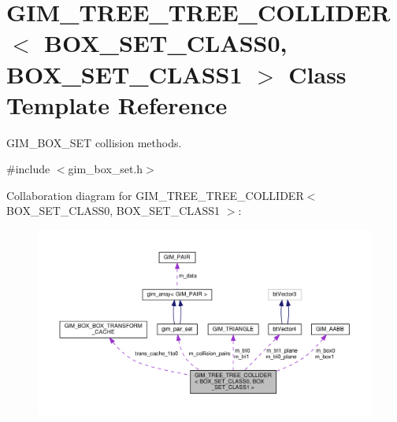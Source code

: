 \hypertarget{classGIM__TREE__TREE__COLLIDER}{}\section{G\+I\+M\+\_\+\+T\+R\+E\+E\+\_\+\+T\+R\+E\+E\+\_\+\+C\+O\+L\+L\+I\+D\+ER$<$ B\+O\+X\+\_\+\+S\+E\+T\+\_\+\+C\+L\+A\+S\+S0, B\+O\+X\+\_\+\+S\+E\+T\+\_\+\+C\+L\+A\+S\+S1 $>$ Class Template Reference}
\label{classGIM__TREE__TREE__COLLIDER}


G\+I\+M\+\_\+\+B\+O\+X\+\_\+\+S\+ET collision methods.  




{\ttfamily \#include $<$gim\+\_\+box\+\_\+set.\+h$>$}



Collaboration diagram for G\+I\+M\+\_\+\+T\+R\+E\+E\+\_\+\+T\+R\+E\+E\+\_\+\+C\+O\+L\+L\+I\+D\+ER$<$ B\+O\+X\+\_\+\+S\+E\+T\+\_\+\+C\+L\+A\+S\+S0, B\+O\+X\+\_\+\+S\+E\+T\+\_\+\+C\+L\+A\+S\+S1 $>$\+:
\nopagebreak
\begin{figure}[H]
\begin{center}
\leavevmode
\includegraphics[width=350pt]{classGIM__TREE__TREE__COLLIDER__coll__graph}
\end{center}
\end{figure}
